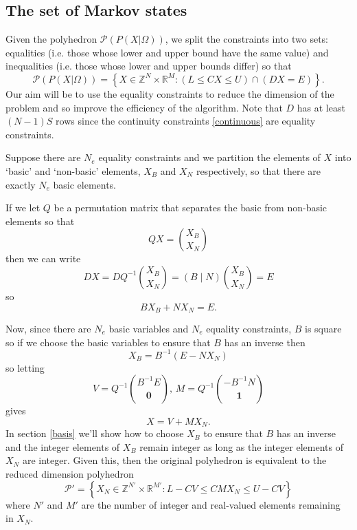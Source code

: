 \documentclass{article}
\begin{document}
\subsection{The set of Markov states}

Given the polyhedron $\mathcal{P}(P(X|\Omega))$, we split the constraints into two sets: equalities (i.e. those whose lower and upper bound have the same value) and inequalities (i.e. those whose lower and upper bounds differ) so that
\begin{equation}
\mathcal{P}(P(X|\Omega)) = \left\{X \in \mathbb{Z}^N \times \mathbb{R}^M: \left(L \le CX \le U\right) \cap \left(DX = E\right) \right\}.
\label{zPolySupport}
\end{equation}
Our aim will be to use the equality constraints to reduce the dimension of the problem and so improve the efficiency of the algorithm. Note that $D$ has at least $(N-1)S$ rows since the continuity constraints \eqref{continuous} are equality constraints. 

Suppose there are $N_e$ equality constraints and we partition the elements of $X$ into `basic' and `non-basic' elements, $X_B$ and $X_N$ respectively, so that there are exactly $N_e$ basic elements.

If we let $Q$ be a permutation matrix that separates the basic from non-basic elements so that
\[
QX = {X_B \choose X_N}
\]
then we can write
\[
DX = DQ^{-1}{X_B \choose X_N} = \left(B \mid N\right){X_B \choose X_N} = E
\]
so
\begin{equation}
BX_B + NX_N = E.
\label{eqconstraints}
\end{equation}

Now, since there are $N_e$ basic variables and $N_e$ equality constraints, $B$ is square so if we choose the basic variables to ensure that $B$ has an inverse then
\begin{equation}
X_B = B^{-1}(E - NX_N)
\label{basicvars}
\end{equation}
so letting
\[
V = Q^{-1}{B^{-1}E \choose \mathbf{0}}, \, M = Q^{-1}{-B^{-1}N \choose \mathbf{1}}
\]
gives
\begin{equation}
X = V + MX_N.
\label{markovtotrajectory}
\end{equation}
In section \ref{basis} we'll show how to choose $X_B$ to ensure that $B$ has an inverse and the integer elements of $X_B$ remain integer as long as the integer elements of $X_N$ are integer. Given this, then the original polyhedron is equivalent to the reduced dimension polyhedron
\begin{equation}
\mathcal{P}' = \left\{X_N \in \mathbb{Z}^{N'} \times \mathbb{R}^{M'}: L-CV \le  CMX_N \le U-CV\right\}
\label{reducedPolySupport}
\end{equation}
where $N'$ and $M'$ are the number of integer and real-valued elements remaining in $X_N$.
\end{document}

